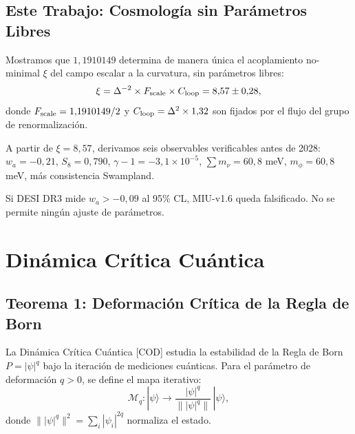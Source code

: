 \documentclass[12pt, a4paper]{article}
\theoremstyle{miuThm}
\theoremstyle{remark}
\newcommand{\qborn}{1{,}1910149}
\begin{document}
\subsection{Este Trabajo: Cosmología sin Parámetros Libres}

Mostramos que $\qborn$ determina de manera única el acoplamiento no-minimal $\xi$
del campo escalar a la curvatura, sin parámetros libres:
\begin{equation}
\xi = \Delta^{-2} \times F_{\rm scale} \times C_{\rm loop} = 8{,}57 \pm 0{,}28,
\label{eq:xi_derivation}
\end{equation}
donde $F_{\rm scale} = \qborn/2$ y $C_{\rm loop} = \Delta^2 \times 1{,}32$ son
fijados por el flujo del grupo de renormalización.

A partir de $\xi = 8{,}57$, derivamos seis observables verificables antes de 2028:
$w_a = -0{,}21$, $S_8 = 0{,}790$, $\gamma-1 = -3{,}1 \times 10^{-5}$,
$\sum m_\nu = 60{,}8$ meV, $m_\phi = 60{,}8$ meV, más consistencia Swampland.

Si DESI DR3 mide $w_a > -0{,}09$ al 95\% CL, MIU-v1.6 queda falsificado.
No se permite ningún ajuste de parámetros.

\section{Dinámica Crítica Cuántica}
\label{sec:COD}

\subsection{Teorema 1: Deformación Crítica de la Regla de Born}
\label{subsec:theorem1}

La Dinámica Crítica Cuántica [COD] estudia la estabilidad de la Regla de Born
$P = |\psi|^{q}$ bajo la iteración de mediciones cuánticas. Para el parámetro
de deformación $q > 0$, se define el mapa iterativo:
\begin{equation}
\mathcal{M}_q: |\psi\rangle \rightarrow \frac{|\psi|^q}{\| |\psi|^q \|} \, |\psi\rangle,
\label{eq:map}
\end{equation}
donde $\| |\psi|^q \|^2 = \sum_i |\psi_i|^{2q}$ normaliza el estado.
\end{document}
